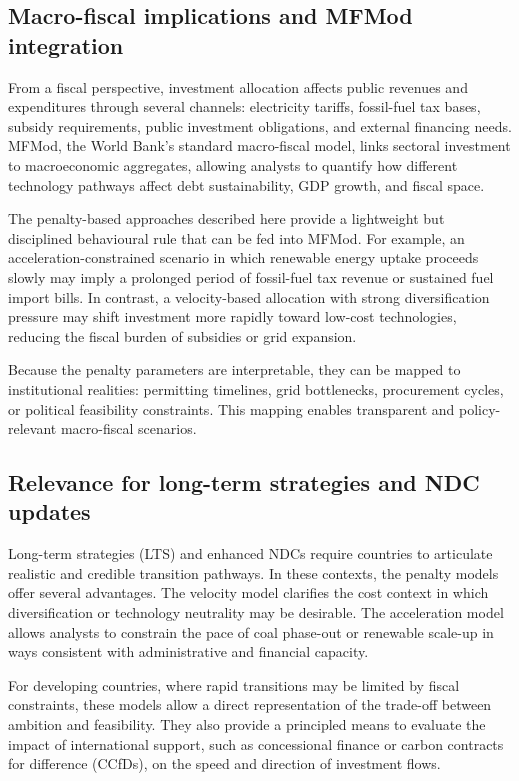 \documentclass[preprint,authoryear,12pt]{elsarticle}
\begin{document}
\subsection{Macro-fiscal implications and MFMod integration}

From a fiscal perspective, investment allocation affects public revenues and expenditures
through several channels: electricity tariffs, fossil-fuel tax bases, subsidy requirements,
public investment obligations, and external financing needs. MFMod, the World Bank’s standard
macro-fiscal model, links sectoral investment to macroeconomic aggregates, allowing analysts to
quantify how different technology pathways affect debt sustainability, GDP growth, and fiscal
space.

The penalty-based approaches described here provide a lightweight but disciplined behavioural
rule that can be fed into MFMod. For example, an acceleration-constrained scenario in which
renewable energy uptake proceeds slowly may imply a prolonged period of fossil-fuel tax revenue
or sustained fuel import bills. In contrast, a velocity-based allocation with strong diversification
pressure may shift investment more rapidly toward low-cost technologies, reducing the fiscal
burden of subsidies or grid expansion.

Because the penalty parameters are interpretable, they can be mapped to institutional realities:
permitting timelines, grid bottlenecks, procurement cycles, or political feasibility constraints.
This mapping enables transparent and policy-relevant macro-fiscal scenarios.

\subsection{Relevance for long-term strategies and NDC updates}

Long-term strategies (LTS) and enhanced NDCs require countries to articulate realistic and
credible transition pathways. In these contexts, the penalty models offer several advantages. The
velocity model clarifies the cost context in which diversification or technology neutrality may be
desirable. The acceleration model allows analysts to constrain the pace of coal phase-out or
renewable scale-up in ways consistent with administrative and financial capacity.

For developing countries, where rapid transitions may be limited by fiscal constraints, these
models allow a direct representation of the trade-off between ambition and feasibility. They also
provide a principled means to evaluate the impact of international support, such as concessional
finance or carbon contracts for difference (CCfDs), on the speed and direction of investment
flows.
\end{document}
